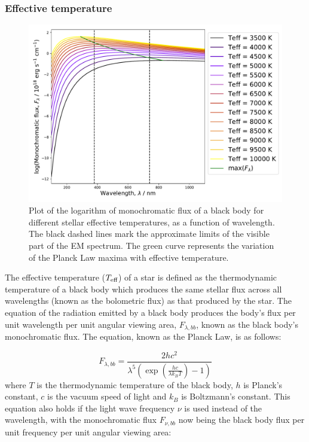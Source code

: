 \documentclass[12pt, a4paper]{report}
\begin{document}
\subsubsection{Effective temperature}

\begin{figure}[h!]
\begin{center}
\includegraphics[width=1.0\textwidth]{blackbody_teff_logF_illustration.pdf}
\caption{Plot of the logarithm of monochromatic flux of a black body for different stellar effective temperatures, as a function of wavelength. The black dashed lines mark the approximate limits of the visible part of the EM spectrum. The green curve represents the variation of the Planck Law maxima with effective temperature.}
\label{planck_curve}
\end{center}
\end{figure}

The effective temperature ($T_{\textnormal{eff}}$) of a star is defined as the thermodynamic temperature of a black body which produces the same stellar flux across all wavelengths (known as the bolometric flux) as that produced by the star. The equation of the radiation emitted by a black body produces the body's flux per unit wavelength per unit angular viewing area, $F_{\lambda,bb}$, known as the black body's monochromatic flux. The equation, known as the Planck Law, is as follows:


\begin{equation}
F_{\lambda,bb} = \frac{2hc^{2}}{\lambda^{5}\left(\exp\left({\frac{hc}{\lambda k_{B}T}}\right) - 1\right)}
\label{planck_bb}
\end{equation}
where $T$ is the thermodynamic temperature of the black body, $h$ is Planck's constant, $c$ is the vacuum speed of light and $k_{B}$ is Boltzmann's constant. This equation also holds if the light wave frequency $\nu$ is used instead of the wavelength, with the monochromatic flux $F_{\nu,bb}$ now being the black body flux per unit frequency per unit angular viewing area:
\end{document}
